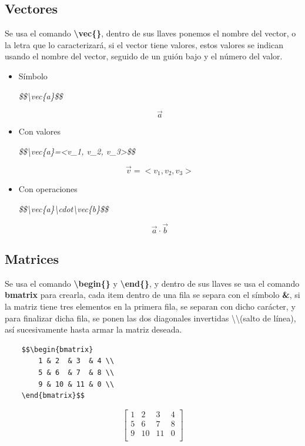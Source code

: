 \subsection{Vectores}
\hspace{0.55cm}Se usa el comando \textbf{\textbackslash{vec\{\}}}, dentro de sus llaves ponemos el nombre del vector, o la letra que lo caracterizará, si el vector tiene valores, estos valores se indican usando el nombre del vector, seguido de un guión bajo y el número del valor.
\begin{itemize}
    \item Símbolo
    \begin{center}
        \textit{\$\$\textbackslash{vec\{a\}}\$\$}
    \end{center}
    $$\vec{a}$$
    \item Con valores
    \begin{center}
        \textit{\$\$\textbackslash{vec\{a\}}=\textless v\_1, v\_2, v\_3\textgreater\$\$}
    \end{center}
    $$\vec{v}=<v_1, v_2, v_3>$$
    \item Con operaciones
    \begin{center}
        \textit{\$\$\textbackslash{vec\{a\}}\textbackslash{cdot}\textbackslash{vec\{b\}}\$\$}
    \end{center}
    $$\vec{a}\cdot\vec{b}$$
\end{itemize}


\subsection{Matrices}
\hspace{0.55cm}Se usa el comando \textbf{\textbackslash{begin\{\}}} y \textbf{\textbackslash{end\{\}}}, y dentro de sus llaves se usa el comando \textbf{bmatrix} para crearla, cada item dentro de una fila se separa con el símbolo \textbf{\&}, si la matriz tiene tres elementos en la primera fila, se separan con dicho carácter, y para finalizar dicha fila, se ponen las dos diagonales invertidas \textbackslash\textbackslash (salto de línea), así sucesivamente hasta armar la matriz deseada.
\begin{lstlisting}
    $$\begin{bmatrix}
        1 & 2  & 3  & 4 \\
        5 & 6  & 7  & 8 \\
        9 & 10 & 11 & 0 \\
    \end{bmatrix}$$
\end{lstlisting}
$$\begin{bmatrix}
    1&2&3&4\\
    5&6&7&8\\
    9&10&11&0\\
\end{bmatrix}$$